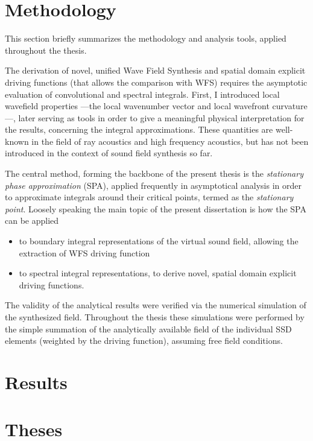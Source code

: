 \documentclass[10pt,twoside]{article}
\theoremstyle{thesisgroupstyle}
\begin{document}
\section{Methodology}

This section briefly summarizes the methodology and analysis tools, applied throughout the thesis.

The derivation of novel, unified Wave Field Synthesis and spatial domain explicit driving functions (that allows the comparison with WFS) requires the asymptotic evaluation of convolutional and spectral integrals.
First, I introduced local wavefield properties ---the local wavenumber vector and local wavefront curvature---, later serving as tools in order to give a meaningful physical interpretation for the results, concerning the integral approximations.
These quantities are well-known in the field of ray acoustics and high frequency acoustics, but has not been introduced in the context of sound field synthesis so far.

The central method, forming the backbone of the present thesis is the \emph{stationary phase approximation} (SPA), applied frequently in asymptotical analysis in order to approximate integrals around their critical points, termed as the \emph{stationary point}.
Loosely speaking the main topic of the present dissertation is how the SPA can be applied 
\begin{itemize}
\item to boundary integral representations of the virtual sound field, allowing the extraction of WFS driving function 
\item to spectral integral representations, to derive novel, spatial domain explicit driving functions.
\end{itemize}
The validity of the analytical results were verified via the numerical simulation of the synthesized field.
Throughout the thesis these simulations were performed by the simple summation of the analytically available field of the individual SSD elements (weighted by the driving function), assuming free field conditions.

\section{Results}

\clearpage
\section{Theses}

\printbibliography[title={Journal papers}, category=journal, prefixnumbers={J}, heading=subbibliography,resetnumbers=true]
\printbibliography[title={Conference papers}, category=conference, prefixnumbers={C}, heading=subbibliography, resetnumbers=true]
\printbibliography[title={Other publications}, category=other, prefixnumbers={O}, heading=subbibliography, resetnumbers=true]
\end{document}
